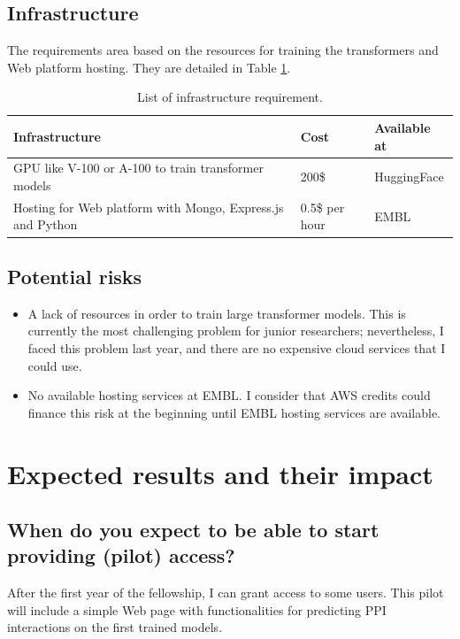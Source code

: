 \documentclass[a4paper,11pt]{article}
\begin{document}
\subsection{Infrastructure}

The requirements area based on the resources for training the transformers and Web platform hosting. They are detailed in Table \ref{tab:infrastructure}.

\begin{table}[]
	\caption{List of infrastructure requirement.}
	\label{tab:infrastructure}
	\begin{tabular}{lll}
		\textbf{Infrastructure}                                    & \textbf{Cost}  & \textbf{Available at} \\ \midrule
		GPU like V-100 or A-100 to train transformer models        & 200\$          & HuggingFace           \\
		Hosting for Web platform with Mongo, Express.js and Python & 0.5\$ per hour & EMBL                 
	\end{tabular}
\end{table}


\subsection{Potential risks }

\begin{itemize}
	\item A lack of resources in order to train large transformer models. This is currently the most challenging problem for junior researchers; nevertheless, I faced this problem last year, and there are no expensive cloud services that I could use.
\item No available hosting services at EMBL. I consider that AWS credits could finance this risk at the beginning until EMBL hosting services are available.
\end{itemize}

\section{Expected results and their impact}
\subsection{When do you expect to be able to start providing (pilot) access?}
After the first year of the fellowship, I can grant access to some users. This pilot will include a simple Web page with functionalities for predicting PPI interactions on the first trained models. 
\end{document}
